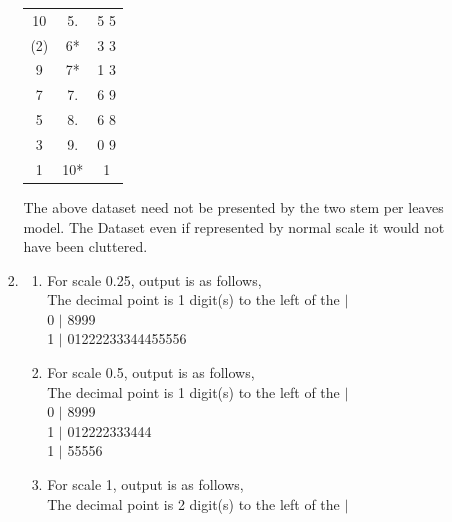 \documentclass{article}
\begin{document}
\begin{enumerate}
\begin{enumerate}
\begin{enumerate}
\begin{center}
\begin{tabular}{|c  |c  |c|}
10&5.&5 5\\
(2)&6*& 3 3\\
9&7*&1 3\\
7&7.&6 9\\
5&8.&6 8\\
3&9.&0 9\\
1&10*&1\\ \hline
\end{tabular}
\end{center}
The above dataset need not be presented by the two stem per leaves model. The Dataset even if represented by normal scale it would not have been cluttered.
\item

\begin{enumerate}
\item For scale 0.25, output is as follows,\\
The decimal point is 1 digit(s) to the left of the $|$\\
  0 $|$ 8999\\
  1 $|$ 01222233344455556
\item For scale 0.5, output is as follows,\\
The decimal point is 1 digit(s) to the left of the $|$\\

  0 $|$ 8999\\
  1 $|$ 012222333444\\
  1 $|$ 55556\\
\item For scale 1, output is as follows,\\
The decimal point is 2 digit(s) to the left of the $|$\\


\end{enumerate}
\end{enumerate}
\end{enumerate}
\end{enumerate}
\end{document}
